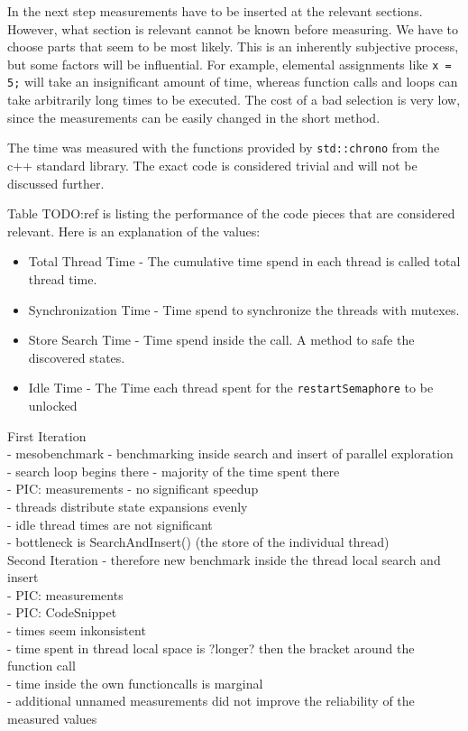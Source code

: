 In the next step measurements have to be inserted at the relevant sections. However, what section is relevant cannot be known before measuring. We have to choose parts that seem to be most likely. This is an inherently subjective process, but some factors will be influential. For example, elemental assignments like \texttt{x = 5;} will take an insignificant amount of time, whereas function calls and loops can take arbitrarily long times to be executed. The cost of a bad selection is very low, since the measurements can be easily changed in the short method.

The time was measured with the functions provided by \texttt{std::chrono} from the c++ standard library. The exact code is considered trivial and will not be discussed further.

Table TODO:ref is listing the performance of the code pieces that are considered relevant. Here is an explanation of the values:
\begin{itemize}
    \item Total Thread Time - The cumulative time spend in each thread is called total thread time.
    \item Synchronization Time - Time spend to synchronize the threads with mutexes.
    \item Store Search Time - Time spend inside the  call. A method to safe the discovered states.
    \item Idle Time - The Time each thread spent for the \texttt{restartSemaphore} to be unlocked
\end{itemize}

First Iteration\\
- mesobenchmark
- benchmarking inside search and insert of parallel exploration\\
- search loop begins there - majority of the time spent there\\
- PIC: measurements
- no significant speedup\\
- threads distribute state expansions evenly\\
- idle thread times are not significant\\
- bottleneck is SearchAndInsert() (the store of the individual thread)\\

Second Iteration
- therefore new benchmark inside the thread local search and insert\\
- PIC: measurements\\
- PIC: CodeSnippet\\
- times seem inkonsistent\\
- time spent in thread local space is ?longer? then the bracket around the function call\\
- time inside the own functioncalls is marginal\\
- additional unnamed measurements did not improve the reliability of the measured values\\

